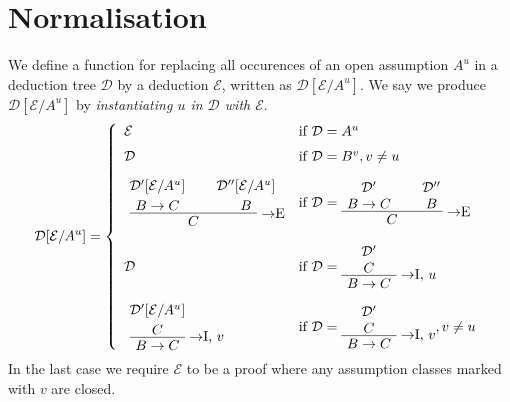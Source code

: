 \section{Normalisation}

\begin{definition}
We define a function for replacing all occurences of an open assumption $A^u$ in
a deduction tree $\mathcal{D}$ by a deduction $\mathcal{E}$, written as
$\mathcal{D}[\mathcal{E}/A^u]$. We say we produce $\mathcal{D}[\mathcal{E}/A^u]$
by \textit{instantiating $u$ in $\mathcal{D}$ with $\mathcal{E}$}.
\[
  \mathcal{D}[\mathcal{E}/A^u] =
  \left\{
  \begin{array}{ll}
  \mathcal{E} & \mbox{if } \mathcal{D} = A^u \\[6pt]
  \mathcal{D} & \mbox{if } \mathcal{D} = B^v, v \neq u \\[10pt]
  \AxiomC{$\mathcal{D}'[\mathcal{E}/A^u]$}
  \noLine
  \UnaryInfC{$B \to C$}
  \AxiomC{$\mathcal{D}''[\mathcal{E}/A^u]$}
  \noLine
  \UnaryInfC{$B$}
  \RightLabel{$\to$E}
  \BinaryInfC{$C$}
  \DisplayProof & \mbox{if } \mathcal{D} =
    \AxiomC{$\mathcal{D}'$}
    \noLine
    \UnaryInfC{$B \to C$}
    \AxiomC{$\mathcal{D}''$}
    \noLine
    \UnaryInfC{$B$}
    \RightLabel{$\to$E}
    \BinaryInfC{$C$}
    \DisplayProof \\[24pt]
  \mathcal{D} & \mbox{if } \mathcal{D} =
    \AxiomC{$\mathcal{D}'$}
    \noLine
    \UnaryInfC{$C$}
    \RightLabel{$\to$I, $u$}
    \UnaryInfC{$B \to C$}
    \DisplayProof \\[20pt]
  \AxiomC{$\mathcal{D}'[\mathcal{E}/A^u]$}
  \noLine
  \UnaryInfC{$C$}
  \RightLabel{$\to$I, $v$}
  \UnaryInfC{$B \to C$}
  \DisplayProof & \mbox{if } \mathcal{D} =
    \AxiomC{$\mathcal{D}'$}
    \noLine
    \UnaryInfC{$C$}
    \RightLabel{$\to$I, $v$}
    \UnaryInfC{$B \to C$}
    \DisplayProof, v \neq u
  \end{array}
  \right.
\]
In the last case we require $\mathcal{E}$ to be a proof where any assumption
classes marked with $v$ are closed.
\end{definition}

